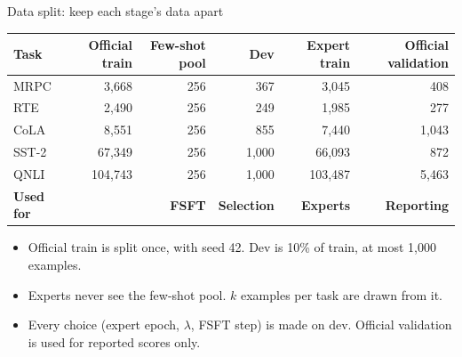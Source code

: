 \documentclass[aspectratio=169,10pt]{beamer}
\begin{document}
\begin{frame}{Data split: keep each stage's data apart}
  \centering
  \small
  \begin{tabular}{l r r r r r}
    \toprule
    Task & Official train & Few-shot pool & Dev & Expert train & Official validation\\
    \midrule
    MRPC & 3,668 & 256 & 367 & 3,045 & 408\\
    RTE & 2,490 & 256 & 249 & 1,985 & 277\\
    CoLA & 8,551 & 256 & 855 & 7,440 & 1,043\\
    SST-2 & 67,349 & 256 & 1,000 & 66,093 & 872\\
    QNLI & 104,743 & 256 & 1,000 & 103,487 & 5,463\\
    \midrule
    \textbf{Used for} & & \textbf{FSFT} & \textbf{Selection} & \textbf{Experts} & \textbf{Reporting}\\
    \bottomrule
  \end{tabular}
  \vfill
  \raggedright
  \begin{itemize}
    \item Official train is split once, with seed 42. Dev is 10\% of train, at most 1,000 examples.
    \item Experts never see the few-shot pool. $k$ examples per task are drawn from it.
    \item Every choice (expert epoch, $\lambda$, FSFT step) is made on dev. Official validation is used for reported scores only.
  \end{itemize}
\end{frame}
\end{document}

